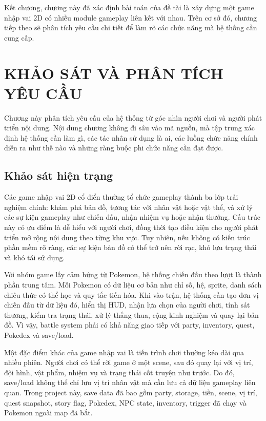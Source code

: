 Kết chương, chương này đã xác định bài toán của đề tài là xây dựng một game nhập vai 2D có nhiều module gameplay liên kết với nhau. Trên cơ sở đó, chương tiếp theo sẽ phân tích yêu cầu chi tiết để làm rõ các chức năng mà hệ thống cần cung cấp.

\chapter{KHẢO SÁT VÀ PHÂN TÍCH YÊU CẦU}

Chương này phân tích yêu cầu của hệ thống từ góc nhìn người chơi và người phát triển nội dung. Nội dung chương không đi sâu vào mã nguồn, mà tập trung xác định hệ thống cần làm gì, các tác nhân sử dụng là ai, các luồng chức năng chính diễn ra như thế nào và những ràng buộc phi chức năng cần đạt được.

\section{Khảo sát hiện trạng}

Các game nhập vai 2D cổ điển thường tổ chức gameplay thành ba lớp trải nghiệm chính: khám phá bản đồ, tương tác với nhân vật hoặc vật thể, và xử lý các sự kiện gameplay như chiến đấu, nhận nhiệm vụ hoặc nhận thưởng. Cấu trúc này có ưu điểm là dễ hiểu với người chơi, đồng thời tạo điều kiện cho người phát triển mở rộng nội dung theo từng khu vực. Tuy nhiên, nếu không có kiến trúc phần mềm rõ ràng, các sự kiện bản đồ có thể trở nên rời rạc, khó lưu trạng thái và khó tái sử dụng.

Với nhóm game lấy cảm hứng từ Pokemon, hệ thống chiến đấu theo lượt là thành phần trung tâm. Mỗi Pokemon có dữ liệu cơ bản như chỉ số, hệ, sprite, danh sách chiêu thức có thể học và quy tắc tiến hóa. Khi vào trận, hệ thống cần tạo đơn vị chiến đấu từ dữ liệu đó, hiển thị HUD, nhận lựa chọn của người chơi, tính sát thương, kiểm tra trạng thái, xử lý thắng thua, cộng kinh nghiệm và quay lại bản đồ. Vì vậy, battle system phải có khả năng giao tiếp với party, inventory, quest, Pokedex và save/load.

Một đặc điểm khác của game nhập vai là tiến trình chơi thường kéo dài qua nhiều phiên. Người chơi có thể rời game ở một scene, sau đó quay lại với vị trí, đội hình, vật phẩm, nhiệm vụ và trạng thái cốt truyện như trước. Do đó, save/load không thể chỉ lưu vị trí nhân vật mà cần lưu cả dữ liệu gameplay liên quan. Trong project này, save data đã bao gồm party, storage, tiền, scene, vị trí, quest snapshot, story flag, Pokedex, NPC state, inventory, trigger đã chạy và Pokemon ngoài map đã bắt.

